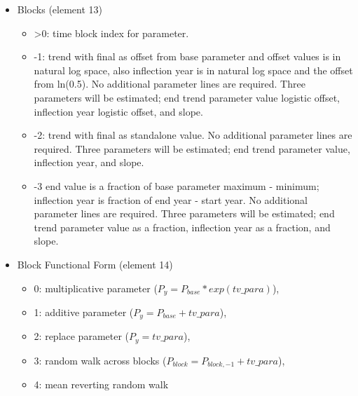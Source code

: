 \begin{itemize}
\item Blocks (element 13)
	\begin{itemize}
		\item >0: time block index for parameter.
		\item -1: trend with final as offset from base parameter and offset values is in natural log space, also inflection year is in natural log space and the offset from ln(0.5). No additional parameter lines are required.  Three parameters will be estimated; end trend parameter value logistic offset, inflection year logistic offset, and slope.
		\item -2: trend with final as standalone value. No additional parameter lines are required. Three parameters will be estimated; end trend parameter value, inflection year, and slope.
		\item -3 end value is a fraction of base parameter maximum - minimum; inflection year is fraction of end year - start year. No additional parameter lines are required. Three parameters will be estimated; end trend parameter value as a fraction, inflection year as a fraction, and slope.
	\end{itemize}
	
\item Block Functional Form (element 14)
	\begin{itemize}
		\item 0: multiplicative parameter ($P_{y} = P_{base}*exp(tv\_para)$),
		\item 1: additive parameter ($P_{y} = P_{base} + tv\_para$),
		\item 2: replace parameter ($P_{y} = tv\_para$),
		\item 3: random walk across blocks ($P_{block} = P_{block,-1} + tv\_para$),
		\item 4: mean reverting random walk
	\end{itemize}
\end{itemize}